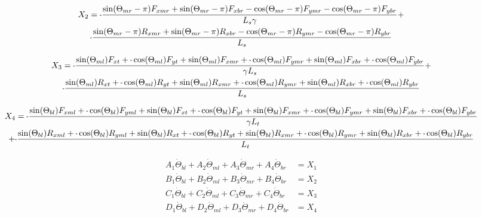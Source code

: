 \documentclass[11pt, landscape]{article}
\newcommand{\mn}{\scalebox{0.7}[1.0]{-}}
\begin{document}
\begin{multline}
  X_2 = \mn\frac{\sin(\Theta_{mr}-\pi)F_{xmr} + \sin(\Theta_{mr}-\pi)F_{xbr} - \cos(\Theta_{mr}-\pi)F_{ymr} - \cos(\Theta_{mr}-\pi)F_{ybr}}{L_{s}\gamma} + \\
  \mn\frac{\sin(\Theta_{mr}-\pi)R_{xmr} + \sin(\Theta_{mr}-\pi)R_{xbr} - \cos(\Theta_{mr}-\pi)R_{ymr} - \cos(\Theta_{mr}-\pi)R_{ybr}}{L_{s}}
\end{multline}

\begin{multline}
  X_3 = \mn \frac{\sin(\Theta_{ml})F_{xt } + \mn \cos(\Theta_{ml})F_{yt } + \sin(\Theta_{ml})F_{xmr} + \mn \cos(\Theta_{ml})F_{ymr} + \sin(\Theta_{ml})F_{xbr} + \mn \cos(\Theta_{ml})F_{ybr}}{\gamma L_s} + \\
	\mn \frac{\sin(\Theta_{ml})R_{xt } + \mn \cos(\Theta_{ml})R_{yt } + \sin(\Theta_{ml})R_{xmr} + \mn \cos(\Theta_{ml})R_{ymr} + \sin(\Theta_{ml})R_{xbr} + \mn \cos(\Theta_{ml})R_{ybr}}{L_s}
\end{multline}

\begin{multline}
  X_4 = \mn \frac{\sin(\Theta_{bl})F_{xml} + \mn\cos(\Theta_{bl})F_{yml} + \sin(\Theta_{bl})F_{xt } + \mn \cos(\Theta_{bl})F_{yt } + \sin(\Theta_{bl})F_{xmr} + \mn \cos(\Theta_{bl})F_{ymr} + \sin(\Theta_{bl})F_{xbr} + \mn \cos(\Theta_{bl})F_{ybr}}
  {\gamma L_t} \\+ \mn \frac{\sin(\Theta_{bl})R_{xml} +\mn \cos(\Theta_{bl})R_{yml} + \sin(\Theta_{bl})R_{xt } + \mn \cos(\Theta_{bl})R_{yt} + \sin(\Theta_{bl})R_{xmr} + \mn \cos(\Theta_{bl})R_{ymr} + \sin(\Theta_{bl})R_{xbr} + \mn \cos(\Theta_{bl})R_{ybr}}{L_t} \\
\end{multline}


\begin{align}
  A_1\dot{\Theta}_{bl} + A_2 \dot{\Theta}_{ml} + A_3 \dot{\Theta}_{mr} + A_4 \dot{\Theta}_{br} &= X_1 \\
  B_1\dot{\Theta}_{bl} + B_2 \dot{\Theta}_{ml} + B_3 \dot{\Theta}_{mr} + B_4 \dot{\Theta}_{br} &= X_2 \\
  C_1\dot{\Theta}_{bl} + C_2 \dot{\Theta}_{ml} + C_3 \dot{\Theta}_{mr} + C_4 \dot{\Theta}_{br} &= X_3 \\
  D_1\dot{\Theta}_{bl} + D_2 \dot{\Theta}_{ml} + D_3 \dot{\Theta}_{mr} + D_4 \dot{\Theta}_{br} &= X_4 \\
\end{align}
\end{document}
